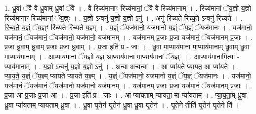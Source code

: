 \documentclass[17pt]{extarticle}
\begin{document}
1. ध्रु॒वां ॅवै वै ध्रु॒वाम् ध्रु॒वां ॅवै । . वै रिच्य॑मानाꣳ॒॒ रिच्य॑मानां॒ ॅवै वै रिच्य॑मानाम् । . रिच्य॑मानां ॅय॒ज्ञो य॒ज्ञो रिच्य॑मानाꣳ॒॒ रिच्य॑मानां ॅय॒ज्ञ्ः । . य॒ज्ञो ऽन्वनु॑ य॒ज्ञो य॒ज्ञो ऽनु॑ । . अनु॑ रिच्यते रिच्य॒ते ऽन्वनु॑ रिच्यते । . रि॒च्य॒ते॒ य॒ज्ञ्ं ॅय॒ज्ञ्ꣳ रि॑च्यते रिच्यते य॒ज्ञ्म् । . य॒ज्ञ्ं ॅयज॑मानो॒ यज॑मानो य॒ज्ञ्ं ॅय॒ज्ञ्ं ॅयज॑मानः । . यज॑मानो॒ यज॑मानं॒ ॅयज॑मानं॒ ॅयज॑मानो॒ यज॑मानो॒ यज॑मानम् । . यज॑मानम् प्र॒जाः प्र॒जा यज॑मानं॒ ॅयज॑मानम् प्र॒जाः । . प्र॒जा ध्रु॒वाम् ध्रु॒वाम् प्र॒जाः प्र॒जा ध्रु॒वाम् । . प्र॒जा इति॑ प्र - जाः । . ध्रु॒वा मा॒प्याय॑माना मा॒प्याय॑मानाम् ध्रु॒वाम् ध्रु॒वा मा॒प्याय॑मानाम् । . आ॒प्याय॑मानां ॅय॒ज्ञो य॒ज्ञ् आ॒प्याय॑माना मा॒प्याय॑मानां ॅय॒ज्ञ्ः । . आ॒प्याय॑माना॒मित्या᳚ - प्याय॑मानाम् । . य॒ज्ञो ऽन्वनु॑ य॒ज्ञो य॒ज्ञो ऽनु॑ । . अन्वा अन्वन्वा । . आ प्या॑यते प्यायत॒ आ प्या॑यते । . प्या॒य॒ते॒ य॒ज्ञ्ं ॅय॒ज्ञ्म् प्या॑यते प्यायते य॒ज्ञ्म् । . य॒ज्ञ्ं ॅयज॑मानो॒ यज॑मानो य॒ज्ञ्ं ॅय॒ज्ञ्ं ॅयज॑मानः । . यज॑मानो॒ यज॑मानं॒ ॅयज॑मानं॒ ॅयज॑मानो॒ यज॑मानो॒ यज॑मानम् । . यज॑मानम् प्र॒जाः प्र॒जा यज॑मानं॒ ॅयज॑मानम् प्र॒जाः । . प्र॒जा आ प्र॒जाः प्र॒जा आ । . प्र॒जा इति॑ प्र - जाः । . आ प्या॑यताम् प्यायता॒ मा प्या॑यताम् । . प्या॒य॒ता॒म् ध्रु॒वा ध्रु॒वा प्या॑यताम् प्यायताम् ध्रु॒वा । . ध्रु॒वा घृ॒तेन॑ घृ॒तेन॑ ध्रु॒वा ध्रु॒वा घृ॒तेन॑ । . घृ॒तेने तीति॑ घृ॒तेन॑ घृ॒तेने ति॑ । \newline
\end{document}

